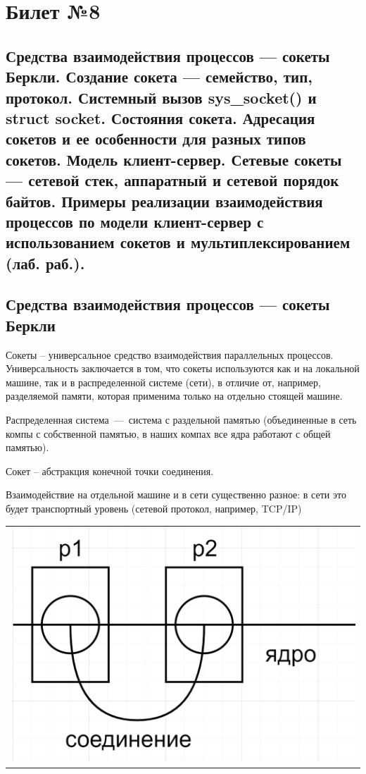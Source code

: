 \chapter{Билет №8}

\section*{Средства взаимодействия процессов — сокеты Беркли. Создание сокета — семейство, тип, протокол. Системный вызов sys\_socket() и struct socket. Состояния сокета. Адресация сокетов и ее особенности для разных типов сокетов. Модель клиент-сервер. Сетевые сокеты — сетевой стек, аппаратный и сетевой порядок байтов. Примеры реализации взаимодействия процессов по модели клиент-сервер с использованием сокетов и мультиплексированием (лаб. раб.).}

\section{Средства взаимодействия процессов — сокеты Беркли}
Сокеты -- универсальное средство взаимодействия параллельных процессов. Универсальность заключается в том, что сокеты используются как и на локальной машине, так и в распределенной системе (сети), в отличие от, например, разделяемой памяти, которая применима только на отдельно стоящей машине.

Распределенная система~---~система с раздельной памятью (объединенные в сеть компы с собственной памятью, в наших компах все ядра работают с общей памятью).

Сокет -- абстракция конечной точки соединения.

Взаимодействие на отдельной машине и в сети существенно разное: в сети это будет транспортный уровень (сетевой протокол, например, TCP/IP)

\begin{table}[H]
  \centering
  \begin{tabular}{p{1\linewidth}}
    \centering
    \includegraphics[width=0.8\linewidth]{./images/1.png}
  \end{tabular}
\end{table}

